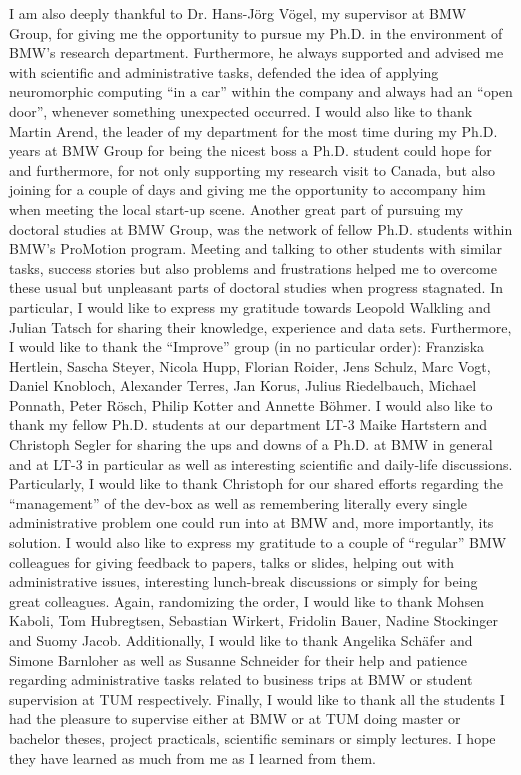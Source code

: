 I am also deeply thankful to Dr. Hans-J\"org V\"ogel, my supervisor at BMW Group, for giving me the opportunity to pursue my Ph.D. in the environment of BMW's research department.
Furthermore, he always supported and advised me with scientific and administrative tasks, defended the idea of applying neuromorphic computing \enquote{in a car} within the company and always had an \enquote{open door}, whenever something unexpected occurred.
I would also like to thank Martin Arend, the leader of my department for the most time during my Ph.D. years at BMW Group for being the nicest boss a Ph.D. student could hope for and furthermore, for not only supporting my research visit to Canada, but also joining for a couple of days and giving me the opportunity to accompany him when meeting the local start-up scene.
Another great part of pursuing my doctoral studies at BMW Group, was the network of fellow Ph.D. students within BMW's ProMotion program.
Meeting and talking to other students with similar tasks, success stories but also problems and frustrations helped me to overcome these usual but unpleasant parts of doctoral studies when progress stagnated.
In particular, I would like to express my gratitude towards Leopold Walkling and Julian Tatsch for sharing their knowledge, experience and data sets.
Furthermore, I would like to thank the \enquote{Improve} group (in no particular order): Franziska Hertlein, Sascha Steyer, Nicola Hupp, Florian Roider, Jens Schulz, Marc Vogt, Daniel Knobloch, Alexander Terres, Jan Korus, Julius Riedelbauch, Michael Ponnath, Peter R\"osch, Philip Kotter and Annette B\"ohmer.
I would also like to thank my fellow Ph.D. students at our department LT-3 Maike Hartstern and Christoph Segler for sharing the ups and downs of a Ph.D. at BMW in general and at LT-3 in particular as well as interesting scientific and daily-life discussions.
Particularly, I would like to thank Christoph for our shared efforts regarding the \enquote{management} of the dev-box as well as remembering literally every single administrative problem one could run into at BMW and, more importantly, its solution.
I would also like to express my gratitude to a couple of \enquote{regular} BMW colleagues for giving feedback to papers, talks or slides, helping out with administrative issues, interesting lunch-break discussions or simply for being great colleagues.
Again, randomizing the order, I would like to thank Mohsen Kaboli, Tom Hubregtsen, Sebastian Wirkert, Fridolin Bauer, Nadine Stockinger and Suomy Jacob. 
Additionally, I would like to thank Angelika Sch\"afer and Simone Barnloher as well as Susanne Schneider for their help and patience regarding administrative tasks related to business trips at BMW or student supervision at TUM respectively.
Finally, I would like to thank all the students I had the pleasure to supervise either at BMW or at TUM doing master or bachelor theses, project practicals, scientific seminars or simply lectures.
I hope they have learned as much from me as I learned from them.

